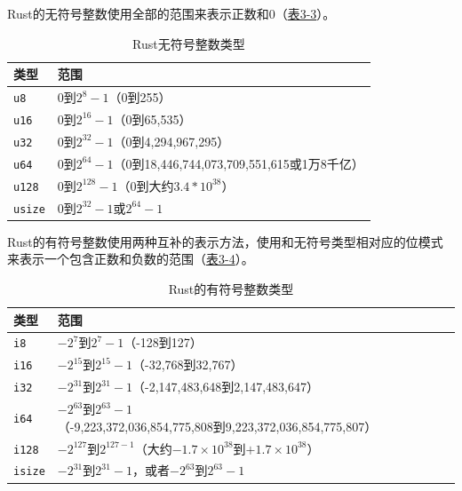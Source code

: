 Rust的无符号整数使用全部的范围来表示正数和0（\hyperref[t3-3]{表3-3}）。
\begin{table}[htbp]
    \centering
    \caption{Rust无符号整数类型}
    \label{t3-3}
    \begin{tabular}{ll}
        \hline
        \textbf{类型}   &   \textbf{范围}                   \\
        \hline
        \texttt{u8}     & 0到$2^{8}-1$（0到255）            \\
        \rowcolor{tablecolor} 
        \texttt{u16}    & 0到$2^{16}-1$（0到65,535）        \\
        \texttt{u32}    & 0到$2^{32}-1$（0到4,294,967,295） \\
        \rowcolor{tablecolor} 
        \texttt{u64}    & 0到$2^{64}-1$（0到18,446,744,073,709,551,615或1万8千亿）  \\
        \texttt{u128}   & 0到$2^{128}-1$（0到大约$3.4*10^{38}$）                    \\
        \rowcolor{tablecolor} 
        \texttt{usize}  & 0到$2^{32}-1$或$2^{64}-1$         \\
    \end{tabular}
\end{table}

Rust的有符号整数使用两种互补的表示方法，使用和无符号类型相对应的位模式来表示一个包含正数和负数的范围（\hyperref[t3-4]{表3-4}）。
\begin{table}[htbp]
    \centering
    \caption{Rust的有符号整数类型}
    \label{t3-4}
    \begin{tabular}{ll}
        \hline
        \textbf{类型}   &   \textbf{范围}   \\
        \hline
        \texttt{i8}     & $-2^{7}$到$2^{7}-1$（-128到127）   \\
        \rowcolor{tablecolor}
        \texttt{i16}    & $-2^{15}$到$2^{15}-1$（-32,768到32,767）  \\
        \texttt{i32}    & $-2^{31}$到$2^{31}-1$（-2,147,483,648到2,147,483,647）    \\
        \rowcolor{tablecolor}
        \texttt{i64}    & $-2^{63}$到$2^{63}-1$（-9,223,372,036,854,775,808到9,223,372,036,854,775,807）    \\
        \texttt{i128}   & $-2^{127}$到$2^{127-1}$（大约$-1.7\times10^{38}$到$+1.7\times10^{38}$） \\
        \rowcolor{tablecolor}
        \texttt{isize}  & $-2^{31}$到$2^{31}-1$，或者$-2^{63}$到$2^{63}-1$  \\
    \end{tabular}
\end{table}

